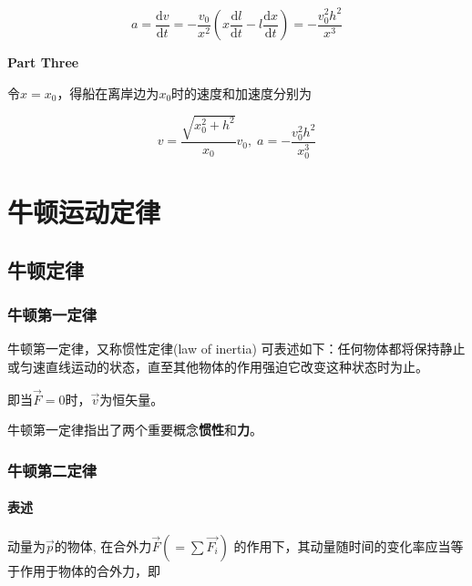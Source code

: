 \documentclass[
	12pt, %
	a4paper, %
]{myLegrandOrangeBook}
\newcommand{\rmd}{\mathrm{d}}
\newcommand{\deriv}[2]{\frac{\rmd #1}{\rmd #2}}
\begin{document}
    \[
        a = \deriv{v}{t} = - \frac{v_{0}}{x^{2}} \left(x \deriv{l}{t} - l \deriv{x}{t}\right)
        = -\frac{v_{0}^{2} h^{2}}{x^{3}}
    \]
    \vspace{1em}

    \textbf{Part Three}

    令\(x=x_{0}\)，得船在离岸边为\(x_{0}\)时的速度和加速度分别为

    \[
        v = \frac{\sqrt{x_{0}^{2} + h^2}}{x_{0}} v_{0},\;
        a = -\frac{v_{0}^{2} h^{2}}{x_{0}^{3}}
    \]

\chapterspaceabove{6.25cm} %
\chapterspacebelow{7.5cm} %

\chapter{牛顿运动定律}

\section{牛顿定律}

\subsection{牛顿第一定律}

    牛顿第一定律，又称惯性定律(law of inertia) 可表述如下：任何物体都将保持静止
    或匀速直线运动的状态，直至其他物体的作用强迫它改变这种状态时为止。

    即当\(\overrightarrow{F} = 0\)时，\(\overrightarrow{v}\)为恒矢量。

    牛顿第一定律指出了两个重要概念\textbf{惯性}和\textbf{力}。

\subsection{牛顿第二定律}

\subsubsection*{表述}

    动量为\(\overrightarrow{p}\)的物体, 在合外力\(\overrightarrow{F} \left(=\sum \overrightarrow{F_{i}}\right)\)
    的作用下，其动量随时间的变化率应当等于作用于物体的合外力，即
\end{document}

